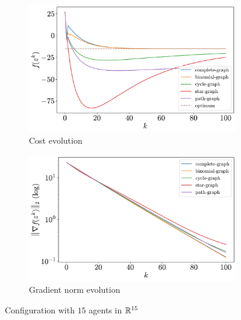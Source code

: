 \documentclass[a4paper,11pt,oneside]{book}
\begin{document}
\begin{figure}[H]
      \centering
      \begin{subfigure}[t]{0.49\textwidth}
            \centering
            \includegraphics[width=\linewidth]{./figs/quadratic/cost_15_15_100.pdf} 
            \caption{Cost evolution}
      \end{subfigure}
      \hfill
      \begin{subfigure}[t]{0.49\textwidth}
            \centering
            \includegraphics[width=\linewidth]{./figs/quadratic/gradient_15_15_100.pdf} 
            \caption{Gradient norm evolution}
      \end{subfigure}
      \caption{Configuration with $15$ agents in ${\mathbb{R}}^{15}$}
      \label{fig:quadratic_15_15}
\end{figure}
\end{document}
